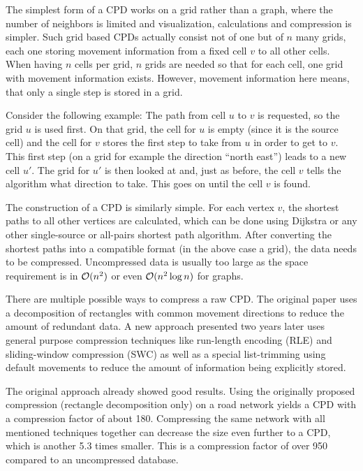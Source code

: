 			The simplest form of a CPD works on a grid rather than a graph, where the number of neighbors is limited and visualization, calculations and compression is simpler.
			Such grid based CPDs actually consist not of one but of $n$ many grids, each one storing movement information from a fixed cell $v$ to all other cells.
			When having $n$ cells per grid, $n$ grids are needed so that for each cell, one grid with movement information exists.
			However, movement information here means, that only a single step is stored in a grid.
			
			Consider the following example:
			The path from cell $u$ to $v$ is requested, so the grid $u$ is used first.
			On that grid, the cell for $u$ is empty (since it is the source cell) and the cell for $v$ stores the first step to take from $u$ in order to get to $v$.
			This first step (on a grid for example the direction \enquote{north east}) leads to a new cell $u'$.
			The grid for $u'$ is then looked at and, just as before, the cell $v$ tells the algorithm what direction to take.
			This goes on until the cell $v$ is found.
			
			The construction of a CPD \cite{botea-cpd-2013} is similarly simple.
			For each vertex $v$, the shortest paths to all other vertices are calculated, which can be done using Dijkstra or any other single-source or all-pairs shortest path algorithm.
			After converting the shortest paths into a compatible format (in the above case a grid), the data needs to be compressed.
			Uncompressed data is usually too large as the space requirement is in $\mathcal{O}(n^2)$ or even $\mathcal{O}(n^2 \log n)$ for graphs.
			
			There are multiple possible ways to compress a raw CPD.
			The original paper uses a decomposition of rectangles with common movement directions to reduce the amount of redundant data.
			A new approach presented two years later uses general purpose compression techniques like run-length encoding (RLE) and sliding-window compression (SWC) as well as a special list-trimming using default movements to reduce the amount of information being explicitly stored.
			
			The original approach already showed good results.
			Using the originally proposed compression (rectangle decomposition only) on a road network yields a CPD with a compression factor of about 180.
			Compressing the same network with all mentioned techniques together can decrease the size even further to a CPD, which is another 5.3 times smaller.
			This is a compression factor of over 950 compared to an uncompressed database.
	
